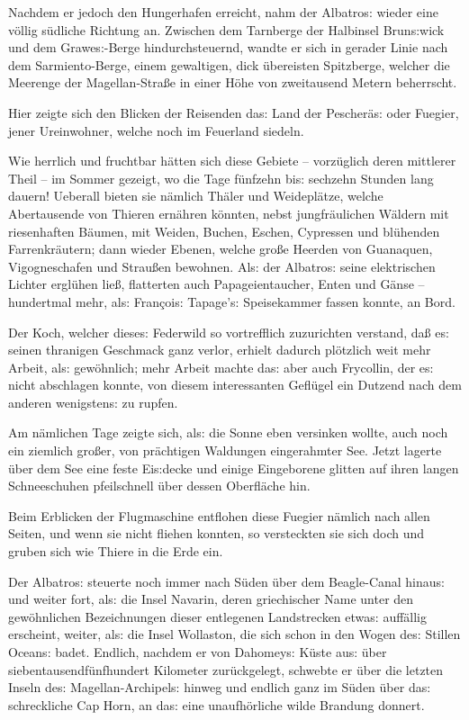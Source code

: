 \documentclass[oneside,12pt]{book}
\newcommand{\s}{s:}
\begin{document}
Nachdem er jedoch den Hungerhafen erreicht, nahm der
{\glqq}Albatro{\s}{\grqq} wieder eine v\"ollig s\"udliche Richtung
an. Zwischen dem Tarnberge der Halbinsel Brun{\s}wick und dem
Grawe{\s}-Berge hindurchsteuernd, wandte er sich in gerader Linie
nach dem Sarmiento-Berge, einem gewaltigen, dick \"ubereisten
Spitzberge, welcher die Meerenge der Magellan-Stra{\ss}e in einer
H\"ohe von zweitausend Metern beherrscht.

Hier zeigte sich den Blicken der Reisenden da{\s} Land der
Pescher\"a{\s} oder Fuegier, jener Ureinwohner, welche noch im
Feuerland siedeln.

Wie herrlich und fruchtbar h\"atten sich diese Gebiete --
vorz\"uglich deren mittlerer Theil -- im Sommer gezeigt, wo die Tage
f\"unfzehn bi{\s} sechzehn Stunden lang dauern! Ueberall bieten sie
n\"amlich Th\"aler und Weidepl\"atze, welche Abertausende von Thieren
ern\"ahren k\"onnten, nebst jungfr\"aulichen W\"aldern mit
riesenhaften B\"aumen, mit Weiden, Buchen, Eschen, Cypressen und
bl\"uhenden Farrenkr\"autern; dann wieder Ebenen, welche gro{\ss}e
Heerden von Guanaquen, Vigogneschafen und Strau{\ss}en bewohnen.
Al{\s} der {\glqq}Albatro{\s}{\grqq} seine elektrischen Lichter
ergl\"uhen lie{\ss}, flatterten auch Papageientaucher, Enten und
G\"anse -- hundertmal mehr, al{\s} Fran\c{c}oi{\s} Tapage'{\s}
Speisekammer fassen konnte, an Bord.

Der Koch, welcher diese{\s} Federwild so vortrefflich zuzurichten
verstand, da{\ss} e{\s} seinen thranigen Geschmack ganz verlor,
erhielt dadurch pl\"otzlich weit mehr Arbeit, al{\s} gew\"ohnlich;
mehr Arbeit machte da{\s} aber auch Frycollin, der e{\s} nicht
abschlagen konnte, von diesem interessanten Gefl\"ugel ein Dutzend
nach dem anderen wenigsten{\s} zu rupfen.

Am n\"amlichen Tage zeigte sich, al{\s} die Sonne eben versinken
wollte, auch noch ein ziemlich gro{\ss}er, von pr\"achtigen Waldungen
eingerahmter See. Jetzt lagerte \"uber dem See eine feste Ei{\s}decke
und einige Eingeborene glitten auf ihren langen Schneeschuhen
pfeilschnell \"uber dessen Oberfl\"ache hin.

Beim Erblicken der Flugmaschine entflohen diese Fuegier n\"amlich
nach allen Seiten, und wenn sie nicht fliehen konnten, so versteckten
sie sich doch und gruben sich wie Thiere in die Erde ein.

Der {\glqq}Albatro{\s}{\grqq} steuerte noch immer nach S\"uden \"uber
dem Beagle-Canal hinau{\s} und weiter fort, al{\s} die Insel Navarin,
deren griechischer Name unter den gew\"ohnlichen Bezeichnungen dieser
entlegenen Landstrecken etwa{\s} auf\/f\"allig erscheint, weiter,
al{\s} die Insel Wollaston, die sich schon in den Wogen de{\s}
Stillen Ocean{\s} badet. Endlich, nachdem er von Dahomey{\s} K\"uste
au{\s} \"uber siebentausendf\"unfhundert Kilometer zur\"uckgelegt,
schwebte er \"uber die letzten Inseln de{\s} Magellan-Archipel{\s}
hinweg und endlich ganz im S\"uden \"uber da{\s} schreckliche Cap
Horn, an da{\s} eine unaufh\"orliche wilde Brandung donnert.
\end{document}
